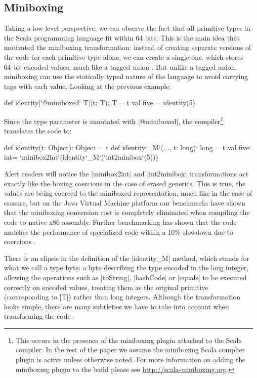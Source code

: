 \subsection{Miniboxing}

Taking a low level perspective, we can observe the fact that all primitive types in the Scala programming language fit within 64 bits. This is the main idea that motivated the miniboxing transformation: instead of creating separate versions of the code for each primitive type alone, we can create a single one, which stores 64-bit encoded values, much like a tagged union \cite{tagged-unions-lua}. But unlike a tagged union, miniboxing can use the statically typed nature of the language to avoid carrying tags with each value. Looking at the previous example:

\begin{lstlisting-nobreak}
 def identity[`@miniboxed` T](t: T): T = t
 val five = identity(5)
\end{lstlisting-nobreak}

Since the type parameter is annotated with |@miniboxed|, the compiler\footnote{This occurs in the presence of the miniboxing plugin attached to the Scala compiler. In the rest of the paper we assume the miniboxing Scala complier plugin is active unless otherwise noted. For more information on adding the miniboxing plugin to the build please see \url{http://scala-miniboxing.org}.} translates the code to:

\begin{lstlisting-nobreak}
 def identity(t: Object): Object = t
 def identity`_M`(..., t: long): long = t
 val five: int= `minibox2int`(identity`_M`(`int2minibox`(5)))
\end{lstlisting-nobreak}

Alert readers will notice the |minibox2int| and |int2minibox| transformations act exactly like the boxing coercions in the case of  erased generics. This is true, the values are being coerced to the miniboxed representation, much like in the case of erasure, but on the Java Virtual Machine platform our benchmarks have shown that the miniboxing conversion cost is completely eliminated when compiling the code to native x86 assembly. Further benchmarking has shown that the code matches the performance of specialized code within a 10\% slowdown due to coercions \cite{miniboxing}.

There is an elipsis in the definition of the |identity_M| method, which stands for what we call a type byte: a byte describing the type encoded in the long integer, allowing the operations such as |toString|, |hashCode| or |equals| to be executed correctly on encoded values, treating them as the original primitive (corresponding to |T|) rather than long integers. Although the transformation looks simple, there are many subtleties we have to take into account when transforming the code \cite{miniboxing,miniboxing-linkedlist,ldl}.
